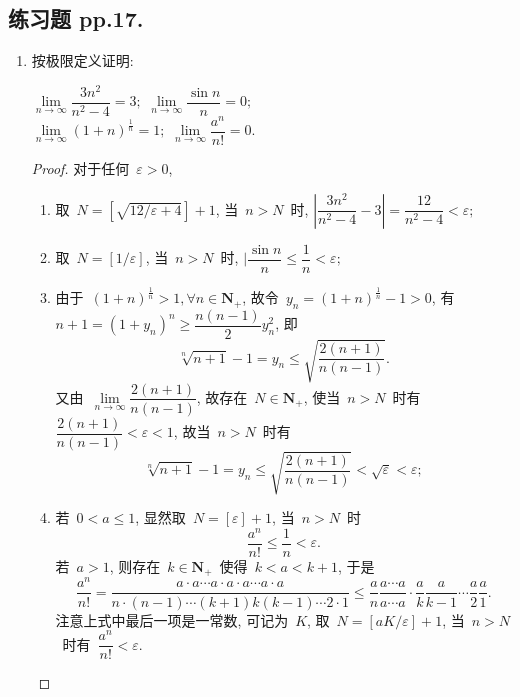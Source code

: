 \documentclass[UTF8,a4paper,10pt,twoside]{book}
\begin{document}
\subsection{练习题 pp.17.}
\begin{enumerate}
	\item 按极限定义证明:
	      \begin{tabenum}[(1)]
		      \tabenumitem $\lim\limits_{n\to\infty} \dfrac{3n^2}{n^2-4}=3;$
		      \tabenumitem $\lim\limits_{n\to\infty} \dfrac{\sin{n}}{n}=0;$\\
		      \tabenumitem $\lim\limits_{n\to\infty} (1+n)^{\frac{1}{n}}=1;$
		      \tabenumitem $\lim\limits_{n\to\infty} \dfrac{a^n}{n!}=0.$
	      \end{tabenum}
	      \begin{proof}
		      对于任何~$\varepsilon>0$,
		      \begin{enumerate}[(1)]
			      \item 取~$N=[\sqrt{12/\varepsilon+4}]+1$, 当~$n>N$~时, $|\dfrac{3n^2}{n^2-4}-3|=\dfrac{12}{n^2-4}<\varepsilon;$
			      \item 取~$N=[1/\varepsilon]$, 当~$n>N$~时, $|\dfrac{\sin{n}}{n}\leqslant\dfrac{1}{n}<\varepsilon;$
			      \item 由于~$(1+n)^{\frac{1}{n}}>1, \forall n\in\mathbf{N}_{+}$, 故令~$y_n=(1+n)^{\frac{1}{n}}-1>0$, 有$n+1=(1+y_n)^n\geqslant \dfrac{n(n-1)}{2}y_n^2$, 即
			            \[
				            \sqrt[n]{n+1}-1=y_n\leqslant\sqrt{\dfrac{2(n+1)}{n(n-1)}}.
			            \]
			            又由~$\lim\limits_{n\to\infty}\dfrac{2(n+1)}{n(n-1)}$, 故存在~$N\in\mathbf{N}_{+}$, 使当~$n>N$~时有~$\dfrac{2(n+1)}{n(n-1)}<\varepsilon<1$, 故当~$n>N$~时有
			            \[
				            \sqrt[n]{n+1}-1=y_n\leqslant\sqrt{\dfrac{2(n+1)}{n(n-1)}}<\sqrt{\varepsilon}<\varepsilon;
			            \]
			      \item 若~$0<a\leqslant 1$, 显然取~$N=[\varepsilon]+1$, 当~$n>N$~时
			            \[
				            \dfrac{a^n}{n!}\leqslant\dfrac{1}{n}<\varepsilon.
			            \]
			            若~$a>1$, 则存在~$k\in\mathbf{N}_{+}$~使得~$k<a<k+1$, 于是
			            \[
				            \dfrac{a^n}{n!}=\dfrac{a\cdot a\cdots a\cdot a\cdot a\cdots a\cdot a}{n\cdot(n-1)\cdots(k+1)k(k-1)\cdots2\cdot1}\leqslant\dfrac{a}{n}\dfrac{a\cdots a}{a\cdots a}\cdot\dfrac{a}{k}\dfrac{a}{k-1}\cdots\dfrac{a}{2}\dfrac{a}{1}.
			            \]
			            注意上式中最后一项是一常数, 可记为~$K$, 取~$N=[aK/\varepsilon]+1$, 当~$n>N$~时有~$\dfrac{a^n}{n!}<\varepsilon.$\qedhere
		      \end{enumerate}

\end{proof}
\end{enumerate}
\end{document}
